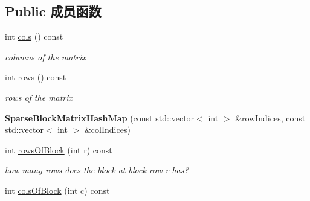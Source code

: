 \subsection*{Public 成员函数}
\begin{DoxyCompactItemize}
\item 
\hypertarget{classg2o_1_1SparseBlockMatrixHashMap_acbf329a1870ef0991faea1a02afbe3a1}{int \hyperlink{classg2o_1_1SparseBlockMatrixHashMap_acbf329a1870ef0991faea1a02afbe3a1}{cols} () const }\label{classg2o_1_1SparseBlockMatrixHashMap_acbf329a1870ef0991faea1a02afbe3a1}

\begin{DoxyCompactList}\small\item\em columns of the matrix \end{DoxyCompactList}\item 
\hypertarget{classg2o_1_1SparseBlockMatrixHashMap_a5f1fed0dc3e768a99aa6c92fc0f77fa2}{int \hyperlink{classg2o_1_1SparseBlockMatrixHashMap_a5f1fed0dc3e768a99aa6c92fc0f77fa2}{rows} () const }\label{classg2o_1_1SparseBlockMatrixHashMap_a5f1fed0dc3e768a99aa6c92fc0f77fa2}

\begin{DoxyCompactList}\small\item\em rows of the matrix \end{DoxyCompactList}\item 
\hypertarget{classg2o_1_1SparseBlockMatrixHashMap_abe4b64edb59d95b632d7f655445157df}{{\bfseries Sparse\-Block\-Matrix\-Hash\-Map} (const std\-::vector$<$ int $>$ \&row\-Indices, const std\-::vector$<$ int $>$ \&col\-Indices)}\label{classg2o_1_1SparseBlockMatrixHashMap_abe4b64edb59d95b632d7f655445157df}

\item 
\hypertarget{classg2o_1_1SparseBlockMatrixHashMap_a2bb620db9811ddac6a3a701b16f678ea}{int \hyperlink{classg2o_1_1SparseBlockMatrixHashMap_a2bb620db9811ddac6a3a701b16f678ea}{rows\-Of\-Block} (int r) const }\label{classg2o_1_1SparseBlockMatrixHashMap_a2bb620db9811ddac6a3a701b16f678ea}

\begin{DoxyCompactList}\small\item\em how many rows does the block at block-\/row r has? \end{DoxyCompactList}\item 
\hypertarget{classg2o_1_1SparseBlockMatrixHashMap_a8c03c74d5c78e30d366cd663270d923c}{int \hyperlink{classg2o_1_1SparseBlockMatrixHashMap_a8c03c74d5c78e30d366cd663270d923c}{cols\-Of\-Block} (int c) const }\label{classg2o_1_1SparseBlockMatrixHashMap_a8c03c74d5c78e30d366cd663270d923c}


\end{DoxyCompactItemize}
